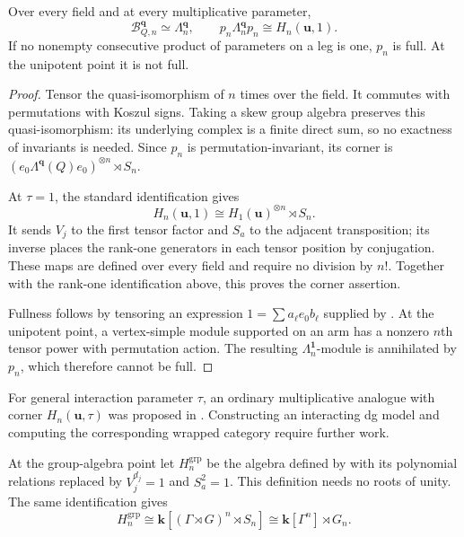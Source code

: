 \documentclass[a4paper]{amsart}
\newcommand{\kk}{\mathbf{k}}
\numberwithin{equation}{section}
\begin{document}
\begin{proposition}\label{prop:tensor-wreath}
Over every field and at every multiplicative parameter,
\[
 \mathcal B_{Q,n}^{\boldsymbol q}\simeq\Lambda_n^{\boldsymbol q},
 \qquad p_n\Lambda_n^{\boldsymbol q}p_n
       \cong H_n(\boldsymbol u,1).
\]
If no nonempty consecutive product of parameters on a leg is
one, $p_n$ is full. At the unipotent point it is not full.
\end{proposition}
\begin{proof}
Tensor the quasi-isomorphism of 
$n$ times over the field. It commutes with permutations with
Koszul signs. Taking a skew group algebra preserves this
quasi-isomorphism: its underlying complex is a finite direct
sum, so no exactness of invariants is needed. Since $p_n$ is
permutation-invariant, its corner is
$(e_0\Lambda^{\boldsymbol q}(Q)e_0)^{\otimes n}\rtimes S_n$.

At $\tau=1$, the standard identification
\cite[Remark~3.2.2]{EGO} gives
\[
 H_n(\boldsymbol u,1)\cong H_1(\boldsymbol u)^{\otimes n}\rtimes S_n.
\]
It sends $V_j$ to the first tensor factor and $S_a$ to the
adjacent transposition; its inverse places the rank-one
generators in each tensor position by conjugation. These maps
are defined over every field and require no division by $n!$.
Together with the rank-one identification above, this proves
the corner assertion.

Fullness follows by tensoring an expression
$1=\sum a_\ell e_0b_\ell$ supplied by .
At the unipotent point, a vertex-simple module supported on an
arm has a nonzero $n$th tensor power with permutation action.
The resulting $\Lambda_n^{\boldsymbol1}$-module is annihilated
by $p_n$, which therefore cannot be full.
\end{proof}

For general interaction parameter $\tau$, an ordinary multiplicative
analogue with corner $H_n(\boldsymbol u,\tau)$ was proposed in
\cite[Introduction]{EGO}. Constructing an interacting dg model and
computing the corresponding wrapped category require further work.

At the group-algebra point let $H_n^{\mathrm{grp}}$ be the
algebra defined by  with its polynomial
relations replaced by $V_j^{d_j}=1$ and $S_a^2=1$. This definition needs no roots of unity. The same identification gives
\[
 H_n^{\mathrm{grp}}\cong
 \kk[(\Gamma\rtimes G)^n\rtimes S_n]
 \cong\kk[\Gamma^n]\rtimes G_n.
\]
\end{document}
